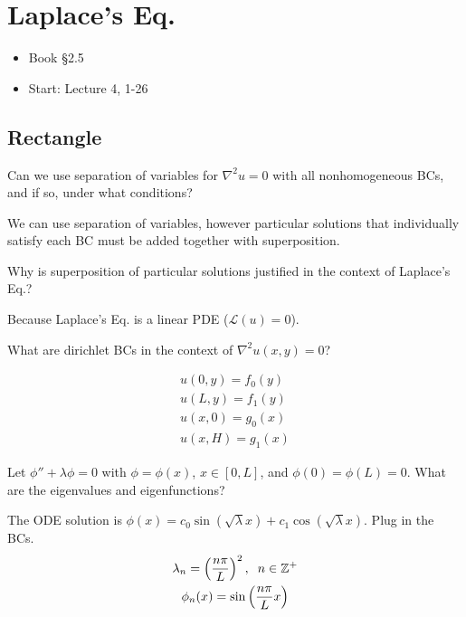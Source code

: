 \chapter{Laplace's Eq.}

\begin{itemize}
	\item Book \S 2.5
	\item Start: Lecture 4, 1-26 
\end{itemize}

\section{Rectangle}

\begin{quest}
	\item Can we use separation of variables for $\nabla^2 u = 0$ with all nonhomogeneous BCs, and if so, under what conditions?
	\begin{ans}
		We can use separation of variables, however particular solutions that individually satisfy each BC must be added together with superposition. 
	\end{ans}

	\item Why is superposition of particular solutions justified in the context of Laplace's Eq.? 
	\begin{ans}
		Because Laplace's Eq. is a linear PDE ($\mathcal{L}(u) = 0 $).
	\end{ans}

	\item What are dirichlet BCs in the context of $\nabla^2 u(x, y) = 0$? 
	\begin{ans}
		\begin{align*}
			u(0, y) = f_0(y) \\
			u(L, y) = f_1(y)  \\
			u(x, 0) = g_0(x) \\
			u(x, H) = g_1(x) 
		\end{align*}
	\end{ans}

	\item Let $\phi'' + \lambda \phi = 0$ with $\phi = \phi(x)$, $x\in [0, L]$, and $\phi(0) = \phi(L) = 0$. What are the eigenvalues and eigenfunctions?
	\begin{ans}
		The ODE solution is $\phi(x) = c_0 \sin (\sqrt{\lambda} x) + c_1 \cos (\sqrt{\lambda} x)$. Plug in the BCs. 
		\begin{gather*}
			\lambda_n = \left( \frac{n\pi}{L} \right)^2, \;\; n\in \mathbb{Z}^+ \\
			\phi_n(x) = \sin \left( \frac{n\pi}{L} x \right) 
		\end{gather*}
	\end{ans}
\end{quest}


